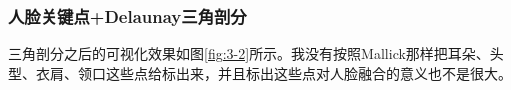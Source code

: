 \documentclass[a4paper]{article}
\begin{document}
\subsubsection{人脸关键点+Delaunay三角剖分}
三角剖分之后的可视化效果如图\ref{fig:3-2}所示。我没有按照Mallick\cite{FM}那样把耳朵、头型、衣肩、领口这些点给标出来，并且标出这些点对人脸融合的意义也不是很大。
\begin{figure}[htp]
\centering
{}
\hfil
{}
\end{figure}
\end{document}
